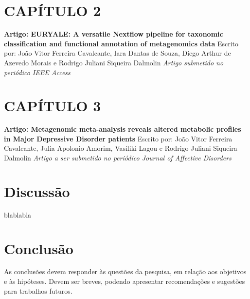 \documentclass[
	12pt,				%
	oneside,			%
	a4paper,			%
	chapter=TITLE,		%
	section=TITLE,		%
	english,			%
	brazil				%
	]{abntex2}
\begin{document}
\chapter*{CAPÍTULO 2}\label{cap2}
\begin{center}
\textbf{Artigo: EURYALE: A versatile Nextflow pipeline for taxonomic classification and functional annotation of metagenomics data}
\bigskip\newline
Escrito por: João Vitor Ferreira Cavalcante, Iara Dantas de Souza, Diego Arthur de Azevedo Morais e Rodrigo Juliani Siqueira Dalmolin
\bigskip\newline
\textit{Artigo submetido no periódico IEEE Access}

\end{center}
\begin{fichacatalografica}
    
\end{fichacatalografica}
\chapter*{CAPÍTULO 3}\label{cap3}
\begin{center}
\textbf{Artigo: Metagenomic meta-analysis reveals altered metabolic profiles in Major Depressive Disorder patients}
\bigskip\newline
Escrito por: João Vitor Ferreira Cavalcante, Julia Apolonio Amorim, Vasiliki Lagou e Rodrigo Juliani Siqueira Dalmolin
\bigskip\newline
\textit{Artigo a ser submetido no periódico Journal of Affective Disorders}

\end{center}
\chapter{Discussão}\label{disc}

blablabla

\chapter{Conclusão}\label{conclusuxe3o}

As conclusões devem responder às questões da pesquisa, em relação aos objetivos
e às hipóteses. Devem ser breves, podendo apresentar recomendações e sugestões
para trabalhos futuros.

\postextual

\begingroup

\printbibliography[title=REFERÊNCIAS]

\endgroup


%
%

\end{document}
